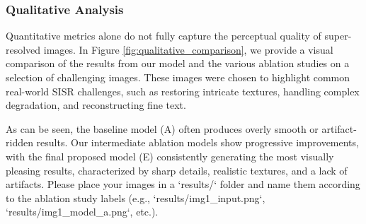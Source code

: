 \documentclass{article}
\begin{document}
\begin{table}[h!]
\centering
\caption{Quantitative comparison of different models on benchmark datasets. We report PSNR / SSIM. Best results are in bold.}
\label{tab:quantitative_results}
\end{table}

\subsubsection{Qualitative Analysis}
Quantitative metrics alone do not fully capture the perceptual quality of super-resolved images. In Figure \ref{fig:qualitative_comparison}, we provide a visual comparison of the results from our model and the various ablation studies on a selection of challenging images. These images were chosen to highlight common real-world SISR challenges, such as restoring intricate textures, handling complex degradation, and reconstructing fine text. 

As can be seen, the baseline model (A) often produces overly smooth or artifact-ridden results. Our intermediate ablation models show progressive improvements, with the final proposed model (E) consistently generating the most visually pleasing results, characterized by sharp details, realistic textures, and a lack of artifacts. Please place your images in a `results/` folder and name them according to the ablation study labels (e.g., `results/img1_input.png`, `results/img1_model_a.png`, etc.).
\end{document}
